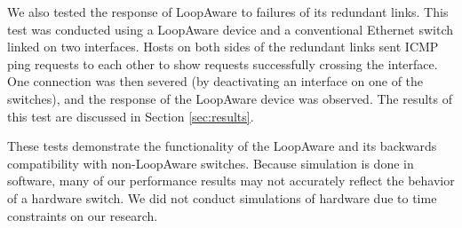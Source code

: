     We also tested the response of LoopAware to failures of its redundant links.
    This test was conducted using a LoopAware device and a conventional Ethernet switch linked on two interfaces.
    Hosts on both sides of the redundant links sent ICMP ping requests to each other to show requests successfully crossing the
    interface.
    One connection was then severed (by deactivating an interface on one of the switches), and the response of the LoopAware device was observed.
    The results of this test are discussed in Section \ref{sec:results}.

    These tests demonstrate the functionality of the LoopAware and its backwards compatibility with non-LoopAware switches.
    Because simulation is done in software, many of our performance results may not accurately reflect the behavior of a hardware switch.
    We did not conduct simulations of hardware due to time constraints on our research.
